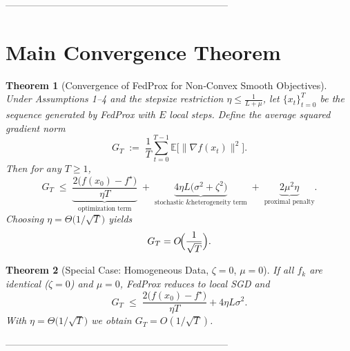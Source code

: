 \documentclass{article}
\newtheorem{theorem}{Theorem}
\newcommand{\EE}{\mathbb{E}}
\begin{document}
---------------------------------------------------------------------

\section*{Main Convergence Theorem}
\begin{theorem}[Convergence of FedProx for Non‑Convex Smooth Objectives]\label{thm:main}
Under Assumptions 1–4 and the stepsize restriction $\eta\le\frac{1}{L+\mu}$,
let $\{x_t\}_{t=0}^{T}$ be the sequence generated by FedProx with $E$ local steps.
Define the average squared gradient norm
\[
G_T\;:=\;\frac{1}{T}\sum_{t=0}^{T-1}\EE\!\bigl[\|\nabla f(x_t)\|^{2}\bigr].
\]
Then for any $T\ge1$,
\[
G_T\;\le\;
\underbrace{\frac{2\bigl(f(x_0)-f^{\star}\bigr)}{\eta T}}_{\text{optimization term}}
\;+\;
\underbrace{4\eta L\bigl(\sigma^{2}+\zeta^{2}\bigr)}_{\text{stochastic \& heterogeneity term}}
\;+\;
\underbrace{2\mu^{2}\eta}_{\text{proximal penalty}}.
\]
Choosing $\eta = \Theta\!\bigl(1/\sqrt{T}\bigr)$ yields
\[
G_T = O\!\Bigl(\frac{1}{\sqrt{T}}\Bigr).
\]
\end{theorem}

\begin{theorem}[Special Case: Homogeneous Data, $\zeta=0$, $\mu=0$]\label{thm:special}
If all $f_k$ are identical ($\zeta=0$) and $\mu=0$, FedProx reduces to local SGD and
\[
G_T\;\le\;\frac{2\bigl(f(x_0)-f^{\star}\bigr)}{\eta T}+4\eta L\sigma^{2}.
\]
With $\eta = \Theta\!\bigl(1/\sqrt{T}\bigr)$ we obtain $G_T = O(1/\sqrt{T})$.
\end{theorem}

---------------------------------------------------------------------
\end{document}
